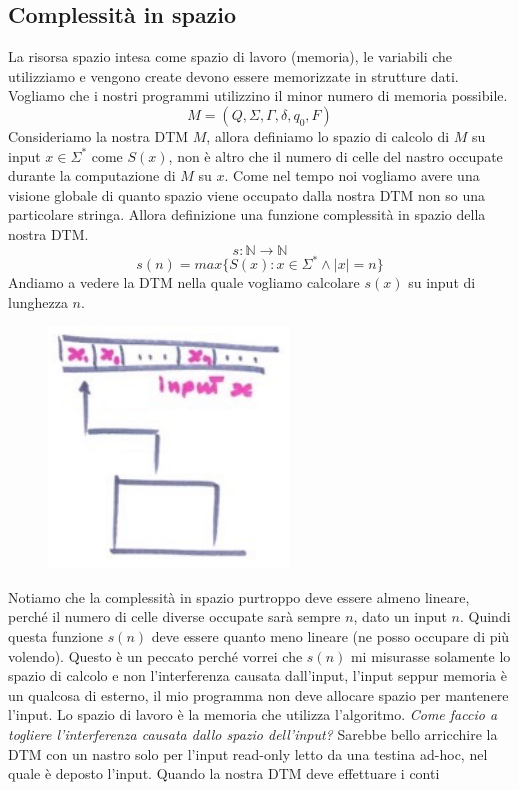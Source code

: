 \documentclass{article}
\begin{document}
\subsection{Complessità in spazio}
La risorsa spazio intesa come spazio di lavoro (memoria), le variabili che utilizziamo e vengono
create devono essere memorizzate in strutture dati. Vogliamo che i nostri programmi utilizzino
il minor numero di memoria possibile.
$$M=(Q,\Sigma,\Gamma,\delta,q_0,F)$$
Consideriamo la nostra DTM $M$, allora definiamo lo spazio di calcolo di $M$ su input $x\in\Sigma^*$
come $S(x)$, non è altro che il numero di celle del nastro occupate durante la computazione
di $M$ su $x$. Come nel tempo noi vogliamo avere una visione globale di quanto spazio viene
occupato dalla nostra DTM non so una particolare stringa. Allora definizione una funzione
complessità in spazio della nostra DTM.
$$s:\mathbb{N}\rightarrow\mathbb{N}$$
$$s(n)=max\{S(x):x\in\Sigma^*\land|x|=n\}$$
Andiamo a vedere la DTM nella quale vogliamo calcolare $s(x)$ su input di lunghezza $n$.
\begin{figure}[H]
    \centering
    \includegraphics[scale=0.6]{images/computazione_DTM.png}
\end{figure}
Notiamo che la complessità in spazio purtroppo deve essere almeno lineare, perché il numero
di celle diverse occupate sarà sempre $n$, dato un input $n$. Quindi questa funzione $s(n)$
deve essere quanto meno lineare (ne posso occupare di più volendo). Questo è un peccato
perché vorrei che $s(n)$ mi misurasse solamente lo spazio di calcolo e non l'interferenza
causata dall'input, l'input seppur memoria è un qualcosa di esterno, il mio programma
non deve allocare spazio per mantenere l'input. Lo spazio di lavoro è la memoria che utilizza
l'algoritmo. \textit{Come faccio a togliere l'interferenza causata dallo spazio
dell'input?} Sarebbe bello arricchire la DTM con un nastro solo per l'input read-only letto
da una testina ad-hoc, nel quale è deposto l'input. Quando la nostra DTM deve effettuare i conti
\end{document}
